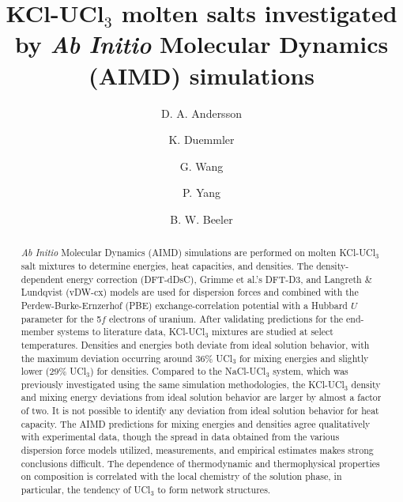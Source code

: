 \documentclass[preprint,3p,10pt,twocolumn,number,sort&compress]{elsarticle}
\begin{document}
\begin{frontmatter}

\title{KCl-UCl$_3$ molten salts investigated by \textit{Ab Initio} Molecular Dynamics (AIMD) simulations}


\author[label1]{D. A. Andersson}
\author[label2]{K. Duemmler}
\author[label1]{G. Wang}
\author[label1]{P. Yang}
\author[label2,label3]{B. W. Beeler}

\address[label1]{Materials Science and Technology Division, Los Alamos National Laboratory P.O. Box 1663, Los Alamos, NM 87545, USA}
\address[label2]{Department of Nuclear Engineering, North Carolina State University, Raleigh, NC, United States}
\address[label3]{Idaho National Laboratory, Idaho Falls, ID 83415, United States}


\begin{abstract}

\textit{Ab Initio} Molecular Dynamics (AIMD) simulations are performed on molten KCl-UCl$_3$ salt mixtures to determine energies, heat capacities, and densities. 
The density-dependent energy correction (DFT-dDsC), Grimme et al.'s DFT-D3, and Langreth \& Lundqvist (vDW-cx) models are used for dispersion forces and combined with the Perdew-Burke-Ernzerhof (PBE) exchange-correlation potential with a Hubbard $U$ parameter for the 5$f$ electrons of uranium. After validating predictions for the end-member systems to literature data, KCl-UCl$_3$ mixtures are studied at select temperatures. Densities and energies both deviate from ideal solution behavior, with the maximum deviation occurring around 36\% UCl$_3$ for mixing energies and slightly lower (29\% UCl$_3$) for densities. Compared to the NaCl-UCl$_3$ system, which was previously investigated using the same simulation methodologies, the KCl-UCl$_3$ density and mixing energy deviations from ideal solution behavior are larger by almost a factor of two. %
It is not possible to identify any deviation from ideal solution behavior for heat capacity. The AIMD predictions for mixing energies and densities agree qualitatively with experimental data, though the spread in data obtained from the various dispersion force models utilized, measurements, and empirical estimates makes strong conclusions difficult. The dependence of thermodynamic and thermophysical properties on composition is correlated with the local chemistry of the solution phase, in particular, the tendency of UCl$_3$ to form network structures.  
\end{abstract}




\end{frontmatter}
\end{document}
